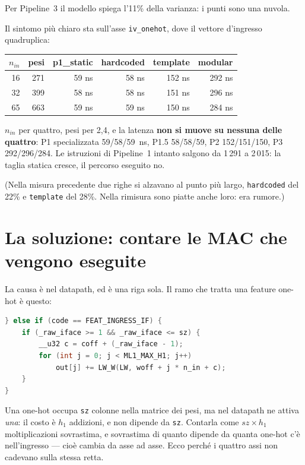 \documentclass[11pt,a4paper,oneside]{report}
\begin{document}
Per Pipeline~3 il modello spiega l'11\% della varianza: i punti sono una nuvola.

Il sintomo più chiaro sta sull'asse \texttt{iv\_onehot}, dove il vettore
d'ingresso quadruplica:

\begin{center}
\small
\begin{tabular}{@{}rrrrrr@{}}
\toprule
$n_{in}$ & \textbf{pesi} & \textbf{p1\_static} & \textbf{hardcoded} &
\textbf{template} & \textbf{modular} \\
\midrule
16 & 271 & 59 ns & 58 ns & 152 ns & 292 ns \\
32 & 399 & 58 ns & 58 ns & 151 ns & 296 ns \\
65 & 663 & 59 ns & 59 ns & 150 ns & 284 ns \\
\bottomrule
\end{tabular}
\end{center}

$n_{in}$ per quattro, pesi per 2,4, e la latenza \textbf{non si muove su
nessuna delle quattro}: P1 specializzata 59/58/59~ns, P1.5 58/58/59, P2
152/151/150, P3 292/296/284. Le
istruzioni di Pipeline~1 intanto salgono da 1\,291 a 2\,015: la taglia statica
cresce, il percorso eseguito no.

(Nella misura precedente due righe si alzavano al punto più largo,
\texttt{hardcoded} del 22\% e \texttt{template} del 28\%. Nella rimisura sono
piatte anche loro: era rumore.)

\section{La soluzione: contare le MAC che vengono eseguite}

La causa è nel datapath, ed è una riga sola. Il ramo che tratta una feature
one-hot è questo:

\begin{lstlisting}[language=C]
} else if (code == FEAT_INGRESS_IF) {
    if (_raw_iface >= 1 && _raw_iface <= sz) {
        __u32 c = coff + (_raw_iface - 1);
        for (int j = 0; j < ML1_MAX_H1; j++)
            out[j] += LW_W(LW, woff + j * n_in + c);
    }
}
\end{lstlisting}

Una one-hot occupa \texttt{sz} colonne nella matrice dei pesi, ma nel datapath
ne attiva \emph{una}: il costo è $h_1$ addizioni, e non dipende da
\texttt{sz}. Contarla come $sz \times h_1$ moltiplicazioni sovrastima, e
sovrastima di quanto dipende da quanta one-hot c'è nell'ingresso --- cioè
cambia da asse ad asse. Ecco perché i quattro assi non cadevano sulla stessa
retta.
\end{document}
